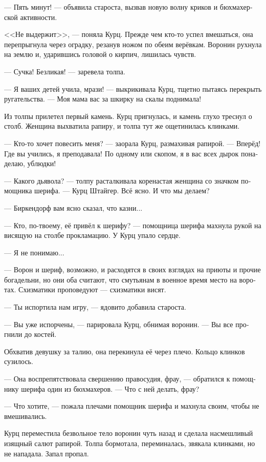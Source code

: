 \documentclass[a4paper,12pt,fleqn]{book}\usepackage{polyglossia}\setdefaultlanguage[babelshorthands=true]{russian}\setotherlanguage{english}\defaultfontfeatures{Ligatures=TeX,Mapping=tex-text}\usepackage{xcolor}\newcommand{\ml}[3]{#2}
\begin{document}
--- Пять минут! --- объявила староста, вызвав новую волну криков и бюхмахерской активности.

<<Не выдержит>>, --- поняла Курц.
Прежде чем кто-то успел вмешаться, она перепрыгнула через оградку, резанув ножом по обеим верёвкам.
Воронин рухнула на землю и, ударившись головой о кирпич, лишилась чувств.

--- Сучка!
Безликая! --- заревела толпа.

--- Я ваших детей учила, мрази! --- выкрикивала Курц, тщетно пытаясь перекрыть ругательства.
--- Моя мама вас за шкирку на скалы поднимала!

Из толпы прилетел первый камень.
Курц пригнулась, и камень глухо треснул о столб.
Женщина выхватила рапиру, и толпа тут же ощетинилась клинками.

--- Кто-то хочет повесить меня? --- заорала Курц, размахивая рапирой.
--- Вперёд!
Где вы учились, я преподавала!
По одному или скопом, я в вас всех дырок понаделаю, ублюдки!

--- Какого дьявола? --- толпу расталкивала коренастая женщина со значком помощника шерифа.
--- Курц Штайгер.
Всё ясно.
И что мы делаем?

--- Биркендорф вам ясно сказал, что казни...

--- Кто, по-твоему, её привёл к шерифу? --- помощница шерифа махнула рукой на висящую на столбе прокламацию.
У Курц упало сердце.

--- Я не понимаю...

--- Ворон и шериф, возможно, и расходятся в своих взглядах на приюты и прочие богадельни, но они оба считают, что смутьянам в военное время место на воротах.
Схизматики проповедуют --- схизматики висят.

--- Ты испортила нам игру, --- ядовито добавила староста.

--- Вы уже испорчены, --- парировала Курц, обнимая воронин.
\ml{$0$}
{--- Вы все прогнили до костей.}
{``Y'all have rotten to the very bones.''}

Обхватив девушку за талию, она перекинула её через плечо.
Кольцо клинков сузилось.

--- Она воспрепятствовала свершению правосудия, фрау, --- обратился к помощнику шерифа один из бюхмахеров.
--- Что с ней делать, фрау?

--- Что хотите, --- пожала плечами помощник шерифа и махнула своим, чтобы не вмешивались.

Курц переместила безвольное тело воронин чуть назад и сделала насмешливый изящный салют рапирой.
Толпа бормотала, переминалась, звякала клинками, но не нападала.
Запал пропал.
\end{document}

